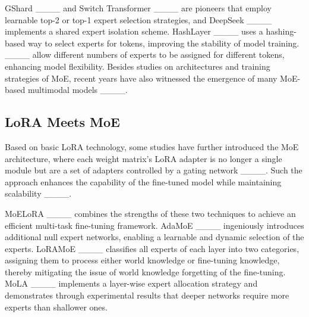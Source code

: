 GShard ____ and Switch Transformer ____ are pioneers that employ learnable top-2 or top-1 expert selection strategies, and DeepSeek ____ implements a shared expert isolation scheme. HashLayer ____ uses a hashing-based way to select experts for tokens, improving the stability of model training. ____ allow different numbers of experts to be assigned for different tokens, enhancing model flexibility. Besides studies on architectures and training strategies of MoE, recent years have also witnessed the emergence of many MoE-based multimodal models ____.

\subsection{LoRA Meets MoE}
Based on basic LoRA technology, some studies have further introduced the MoE architecture, where each weight matrix's LoRA adapter is no longer a single module but are a set of adapters controlled by a gating network ____. Such the approach enhances the capability of the fine-tuned model while maintaining scalability ____. 

MoELoRA ____ combines the strengths of these two techniques to achieve an efficient multi-task fine-tuning framework. 
AdaMoE ____ ingeniously introduces additional null expert networks, enabling a learnable and dynamic selection of the experts. 
LoRAMoE ____ classifies all experts of each layer into two categories, assigning them to process either world knowledge or fine-tuning knowledge, thereby mitigating the issue of world knowledge forgetting of the fine-tuning. 
MoLA ____ implements a layer-wise expert allocation strategy and demonstrates through experimental results that deeper networks require more experts than shallower ones.